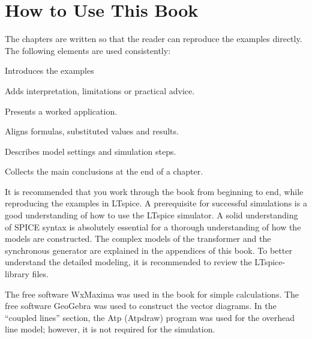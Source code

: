 \chapter*{How to Use This Book}
The chapters are written so that the reader can reproduce the examples directly. The following elements are used consistently:
\begin{description}[style=nextline,leftmargin=32mm]
	\item[Introduction] Introduces the examples
	\item[Remark] Adds interpretation, limitations or practical advice.
	\item[Example] Presents a worked application.
	\item[Calculation] Aligns formulas, substituted values and results.
	\item[Simulation] Describes model settings and simulation steps.
	\item[Chapter Summary] Collects the main conclusions at the end of a chapter.
\end{description}
 
\vspace{11mm}

It is recommended that you work through the book from beginning to end, while reproducing the examples in LTspice. A prerequisite for successful simulations is a good understanding of how to use the LTspice simulator. A solid understanding of SPICE syntax is absolutely essential for a thorough understanding of how the models are constructed.
The complex models of the transformer and the synchronous generator are explained in the appendices of this book. To better understand the detailed modeling, it is recommended to review the LTspice-library files.

The free software WxMaxima was used in the book for simple calculations. The free software GeoGebra was used to construct the vector diagrams. In the “coupled lines” section, the Atp (Atpdraw) program was used for the overhead line model; however, it is not required for the simulation.

